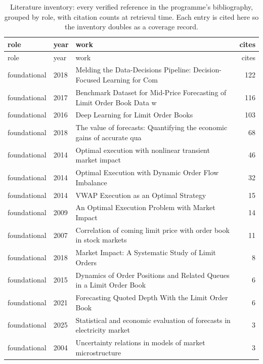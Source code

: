 \begin{longtable}{llp{9.2cm}r}
\caption{Literature inventory: every verified reference in the programme's bibliography,
grouped by role, with citation counts at retrieval time. Each entry is cited here so the
inventory doubles as a coverage record.}
\label{tab:litinv}\\
\toprule
role & year & work & cites \\
\midrule
\endfirsthead
\toprule
role & year & work & cites \\
\midrule
\endhead
\bottomrule
\endfoot
foundational & 2018 & Melding the Data-Decisions Pipeline: Decision-Focused Learning for Com~\citep{wilder2018melding} & 122 \\
foundational & 2017 & Benchmark Dataset for Mid-Price Forecasting of Limit Order Book Data w~\citep{ntakaris2017benchmark} & 116 \\
foundational & 2016 & Deep Learning for Limit Order Books~\citep{sirignano2016deep} & 103 \\
foundational & 2018 & The value of forecasts: Quantifying the economic gains of accurate qua~\citep{kath2018value} & 68 \\
foundational & 2014 & Optimal execution with nonlinear transient market impact~\citep{curato2014optimal} & 46 \\
foundational & 2014 & Optimal Execution with Dynamic Order Flow Imbalance~\citep{bechler2014optimal} & 32 \\
foundational & 2014 & VWAP Execution as an Optimal Strategy~\citep{kato2014vwap} & 15 \\
foundational & 2009 & An Optimal Execution Problem with Market Impact~\citep{kato2009optimal} & 14 \\
foundational & 2007 & Correlation of coming limit price with order book in stock markets~\citep{maskawa2007correlation} & 11 \\
foundational & 2018 & Market Impact: A Systematic Study of Limit Orders~\citep{said2018market} & 8 \\
foundational & 2015 & Dynamics of Order Positions and Related Queues in a Limit Order Book~\citep{guo2015dynamics} & 6 \\
foundational & 2021 & Forecasting Quoted Depth With the Limit Order Book~\citep{libman2021forecasting} & 6 \\
foundational & 2025 & Statistical and economic evaluation of forecasts in electricity market~\citep{maciejowska2025statistical} & 3 \\
foundational & 2004 & Uncertainty relations in models of market microstructure~\citep{theodosopoulos2004uncertainty} & 3 \\

\end{longtable}
